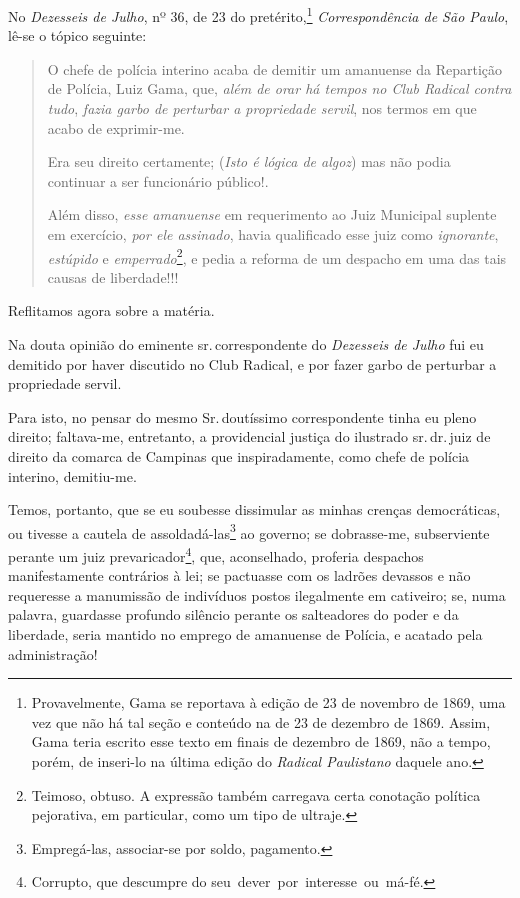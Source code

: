 No \emph{Dezesseis de Julho}, nº 36, de 23 do pretérito,\footnote{
  Provavelmente, Gama se reportava à edição de 23 de novembro de 1869, uma vez que
  não há tal seção e conteúdo na de 23 de dezembro de 1869. Assim, Gama teria
  escrito esse texto em finais de dezembro de 1869, não a tempo, porém,
  de inseri-lo na última edição do \emph{Radical Paulistano} daquele
  ano.} \emph{Correspondência de São Paulo}, lê-se o tópico seguinte:

\begin{quote}
O chefe de polícia interino acaba de demitir um amanuense da Repartição
de Polícia, Luiz Gama, que, \emph{além de orar há tempos no Club Radical
contra tudo}, \emph{fazia garbo de perturbar a propriedade servil}, nos
termos em que acabo de exprimir-me.

Era seu direito certamente; (\emph{Isto é lógica de algoz}) mas não
podia continuar a ser funcionário público!.

Além disso, \emph{esse amanuense} em requerimento ao Juiz Municipal
suplente em exercício, \emph{por ele assinado}, havia qualificado esse
juiz como \emph{ignorante}, \emph{estúpido} e
\emph{emperrado}\footnote{ Teimoso, obtuso. A expressão também
  carregava certa conotação política pejorativa, em particular, como um
  tipo de ultraje.}, e pedia a reforma de um despacho em uma das tais 
  causas de liberdade!!!
\end{quote}  

Reflitamos agora sobre a matéria.

Na douta opinião do eminente sr.\,correspondente do \emph{Dezesseis de
Julho} fui eu demitido por haver discutido no Club Radical, e por fazer
garbo de perturbar a propriedade servil.

Para isto, no pensar do mesmo Sr.\,doutíssimo correspondente tinha eu
pleno direito; faltava-me, entretanto, a providencial justiça do
ilustrado sr.\,dr.\,juiz de direito da comarca de Campinas que
inspiradamente, como chefe de polícia interino, demitiu-me.

Temos, portanto, que se eu soubesse dissimular as minhas crenças
democráticas, ou tivesse a cautela de assoldadá-las\footnote{
  Empregá-las, associar-se por soldo, pagamento.} ao governo; se
dobrasse-me, subserviente perante um juiz prevaricador\footnote{
  Corrupto, que descumpre do seu~dever~por~interesse~ou~má-fé.}, que,
aconselhado, proferia despachos manifestamente contrários à lei; se
pactuasse com os ladrões devassos e não requeresse a manumissão de
indivíduos postos ilegalmente em cativeiro; se, numa palavra, guardasse
profundo silêncio perante os salteadores do poder e da liberdade, seria
mantido no emprego de amanuense de Polícia, e acatado pela
administração!

